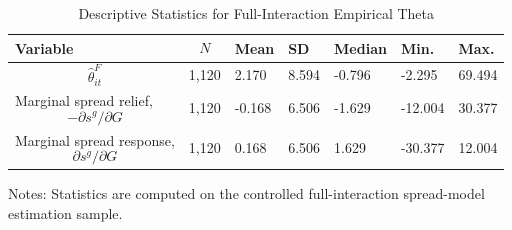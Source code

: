 \begin{table}[H]\centering
\begin{threeparttable}
\caption{Descriptive Statistics for Full-Interaction Empirical Theta}
\label{tab:theta_descriptive_stats}
\scriptsize
\begin{tabularx}{\textwidth}{lYYYYYY}
\toprule
Variable & $$N$$ & Mean & SD & Median & Min. & Max. \\
\midrule
$$\widehat{\theta}^{F}_{it}$$ & 1,120 & 2.170 & 8.594 & -0.796 & -2.295 & 69.494 \\
Marginal spread relief, $$-\partial s^g/\partial G$$ & 1,120 & -0.168 & 6.506 & -1.629 & -12.004 & 30.377 \\
Marginal spread response, $$\partial s^g/\partial G$$ & 1,120 & 0.168 & 6.506 & 1.629 & -30.377 & 12.004 \\
\bottomrule
\end{tabularx}
\begin{tablenotes}[flushleft]\footnotesize
\item Notes: Statistics are computed on the controlled full-interaction spread-model estimation sample.
\end{tablenotes}
\end{threeparttable}
\end{table}
